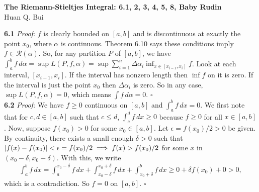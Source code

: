 \documentclass[11pt]{article}
\begin{document}
\begin{center}
{\Large\bf  The Riemann-Stieltjes Integral:  6.1, 2, 3, 4, 5, 8, Baby Rudin}\\
$\,$\\
{\Large  Huan Q. Bui}
\end{center}




\noindent \textbf{6.1}
\noindent \textit{Proof:} $f$ is clearly bounded on $[a,b]$ and is discontinuous at exactly the point $x_0$, where $\alpha$ is continuous. Theorem 6.10 says these conditions imply $f \in \mathscr{R}(\alpha)$. So, for any partition $P$ of $[a,b]$, we have $\int^b_a f\,d\alpha = \sup L(P,f,\alpha) = \sup \sum^n_{i=1}\Delta \alpha_i \inf_{x\in [x_{i-1},x_i] }f $. Look at each interval, $[x_{i-1},x_i]$. If the interval has nonzero length then $\inf f$ on it is zero. If the interval is just the point $x_0$ then $\Delta \alpha_i$ is zero. So in any case, $\sup L(P,f,\alpha) = 0$, which means $\int f\, d\alpha = 0.$ \hfill $\square$\\


\noindent \textbf{6.2}
\noindent \textit{Proof:} We have $f\geq 0$ continuous on $[a,b]$ and $\int^b_a f\,dx = 0$. We first note that for $c,d \in [a,b]$ such that $c\leq d$, $\int^d_c f\,dx \geq 0$ because $f\geq 0$ for all $x \in [a,b]$. Now, suppose $f(x_0) > 0$ for some $x_0 \in [a,b]$. Let $\epsilon = f(x_0)/2 > 0$ be given. By continuity, there exists a small enough $\delta > 0$ such that $\abs{f(x) - f(x_0)} < \epsilon = f(x_0)/2 \implies f(x) > f(x_0)/2 $  for some $x$ in $(x_0 - \delta, x_0 + \delta)$. With this, we write
\begin{align*}
\int^b_a f\,dx = \int^{x_0 - \delta}_a f\,dx + \int^{x_0+\delta}_{x_0 - \delta}f\,dx + \int^b_{x_0+\delta}f\,dx \geq 0 + \delta f(x_0) + 0 > 0,
\end{align*}
which is a contradiction. So $f = 0$ on $[a,b]$. \hfill $\square$\\
\end{document}
